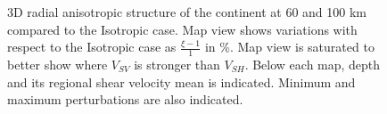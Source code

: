 \documentclass[12pt]{article}
\begin{document}
\begin{figure}
		\caption{\baselineskip 18pt 
		3D radial anisotropic structure of the continent at 60 and 100 \: km compared to the Isotropic case. 
		Map view shows variations with respect to the Isotropic case as $\frac{\xi - 1}{1}$ in \%. 
		Map view is saturated to better show where $V_{SV}$ is stronger than $V_{SH}$.
		Below each map, depth and its regional shear velocity mean is indicated. Minimum and maximum perturbations are also indicated.}
		\label{3d-xi-iso-100km}

	\end{figure}


%
\end{document}

